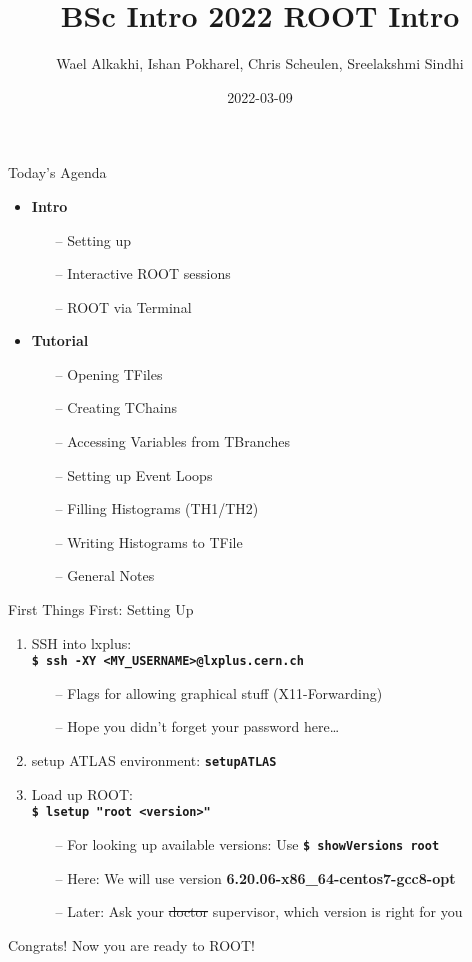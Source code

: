 \documentclass[10pt, aspectratio=169]{beamer}
\title{\Large\color{ugoelogodark} BSc Intro 2022 ROOT Intro}
\author[]{Wael Alkakhi, Ishan Pokharel, Chris Scheulen, Sreelakshmi Sindhi}
\institute[Univ. of G\"ottingen]{II.~Physikalisches Institut, Georg-August-Universit\"at G\"ottingen}
\date{2022-03-09}
\begin{document}
\begin{frame}
  \titlepage
\end{frame}

\begin{frame}{Today's Agenda}

  \begin{itemize}
    \item
    \textbf{Intro}
    \begin{itemize}
      \item[--] Setting up
      \item[--] Interactive ROOT sessions
      \item[--] ROOT via Terminal
    \end{itemize}
    \item
    \textbf{Tutorial}
    \begin{itemize}
      \item[--] Opening TFiles
      \item[--] Creating TChains
      \item[--] Accessing Variables from TBranches
      \item[--] Setting up Event Loops
      \item[--] Filling Histograms (TH1/TH2)
      \item[--] Writing Histograms to TFile
      \item[--] General Notes
    \end{itemize}
  \end{itemize}
\end{frame}

\begin{frame}{First Things First: Setting Up}
  \normalsize
  \begin{enumerate}
    \item
      SSH into lxplus: \\ \textbf{\texttt{\$ ssh -XY <MY\_USERNAME>@lxplus.cern.ch}}
    \begin{itemize}
      \item[--] Flags for allowing graphical stuff (X11-Forwarding)
      \item[--] Hope you didn't forget your password here\ldots
    \end{itemize}
    \item
      setup ATLAS environment: \textbf{\texttt{setupATLAS}}
    \item
      Load up ROOT: \\ \textbf{\texttt{\$ lsetup "root <version>"}}
    \begin{itemize}
      \item[--] For looking up available versions: Use \textbf{\texttt{\$ showVersions root}}
      \item[--] Here: We will use version \textbf{6.20.06-x86\_64-centos7-gcc8-opt}
      \item[--] Later: Ask your \sout{doctor} supervisor, which version is right for you
    \end{itemize}
  \end{enumerate}
  \large Congrats! Now you are ready to ROOT!
\end{frame}
\end{document}
